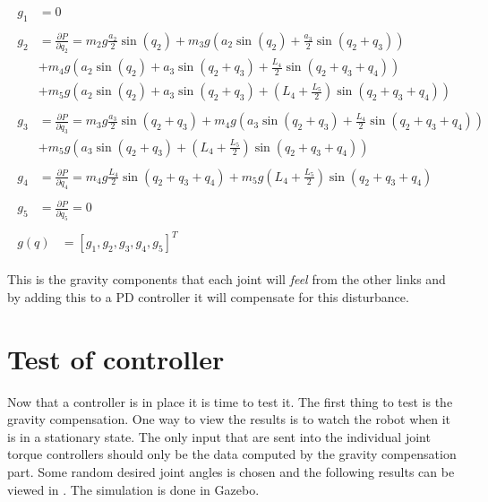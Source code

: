 \begin{align*}
    \begin{split}
        g_1 &= 0
    \end{split}\\
    \begin{split}
        g_2 &= \frac{\partial P}{\partial q_2} = 
        m_2g\frac{a_2}{2}\sin{(q_2)}+
        m_3g\left( a_2 \sin{(q_2)} + \frac{a_3}{2}\sin{(q_2+q_3)} \right)\\&+
        m_4g\left( a_2 \sin{(q_2)} + a_3\sin{(q_2 + q_3)} + \frac{L_4}{2}\sin{(q_2+q_3+q_4)} \right)\\&+
        m_5g\left( a_2 \sin{(q_2)} + a_3\sin{(q_2 + q_3)} + \left(L_4 + \frac{L_5}{2} \right)\sin{(q_2+q_3+q_4)} \right)
    \end{split}\\
    \begin{split}
        g_3 &= \frac{\partial P}{\partial q_3} =
        m_3g\frac{a_3}{2}\sin{(q_2+q_3)} +
        m_4g\left( a_3\sin{(q_2 + q_3)} + \frac{L_4}{2}\sin{(q_2+q_3+q_4)} \right)\\&+
        m_5g\left(  a_3\sin{(q_2 + q_3)} + \left(L_4 + \frac{L_5}{2} \right)\sin{(q_2+q_3+q_4)} \right)
    \end{split}\\
    \begin{split}
        g_4 &=\frac{\partial P}{\partial q_4} = 
        m_4g\frac{L_4}{2}\sin{(q_2+q_3+q_4)}+
        m_5g\left(L_4 + \frac{L_5}{2} \right)\sin{(q_2+q_3+q_4)}
    \end{split}\\
    \begin{split}
        g_5 &= \frac{\partial P}{\partial q_5} = 0
    \end{split}\\
    \begin{split}
        g(q) &= [g_1,g_2,g_3,g_4,g_5]^T
     \end{split}
\end{align*}

 
This is the gravity components that each joint will \textit{feel} from the other links and by adding this to a PD controller it will compensate for this disturbance. 

\section{Test of controller}
Now that a controller is in place it is time to test it. The first thing to test is the gravity compensation. One way to view the results is to watch the robot when it is in a stationary state. The only input that are sent into the individual joint torque controllers should only be the data computed by the gravity compensation part. Some random desired joint angles is chosen and the following results can be viewed in . The simulation is done in Gazebo.

